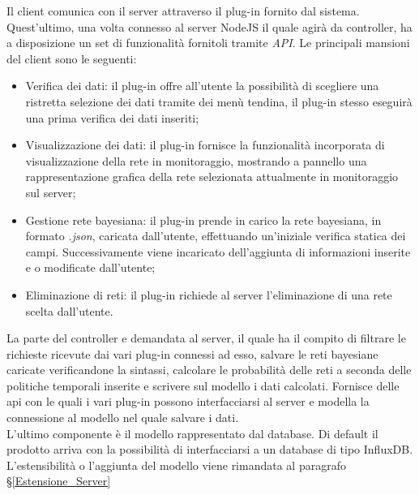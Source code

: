 Il client comunica con il server attraverso il plug-in fornito dal sistema. Quest'ultimo, una volta connesso al server NodeJS il quale agirà da controller, ha a disposizione un set di funzionalità fornitoli tramite \textit{API}\glossario . Le principali mansioni del client sono le seguenti: 
\begin{itemize}
	\item Verifica dei dati: il plug-in offre all'utente la possibilità di scegliere una ristretta selezione dei dati tramite dei menù tendina, il plug-in stesso eseguirà una prima verifica dei dati inseriti;
	\item Visualizzazione dei dati: il plug-in fornisce la funzionalità incorporata di visualizzazione della rete in monitoraggio, mostrando a pannello una rappresentazione grafica della rete selezionata attualmente in monitoraggio sul server;
	\item Gestione rete bayesiana: il plug-in prende in carico la rete bayesiana, in formato \textit{.json}, caricata dall'utente, effettuando un'iniziale verifica statica dei campi. Successivamente viene incaricato dell'aggiunta di informazioni inserite e o modificate dall'utente; 
	\item Eliminazione di reti: il plug-in richiede al server l'eliminazione di una rete scelta dall'utente. 
\end{itemize}
La parte del controller e demandata al server, il quale ha il compito di filtrare le richieste ricevute dai vari plug-in connessi ad esso, salvare le reti bayesiane caricate verificandone la sintassi, calcolare le probabilità delle reti a seconda delle politiche temporali inserite e scrivere sul modello i dati calcolati. 
Fornisce delle api con le quali i vari plug-in possono interfacciarsi al server e modella la connessione al modello nel quale salvare i dati. \\ 
L'ultimo componente è il modello rappresentato dal database. Di default il prodotto arriva con la possibilità di interfacciarsi a un database
di tipo InfluxDB. L'estensibilità o l'aggiunta del modello viene rimandata al paragrafo §\ref{Estensione_Server}



